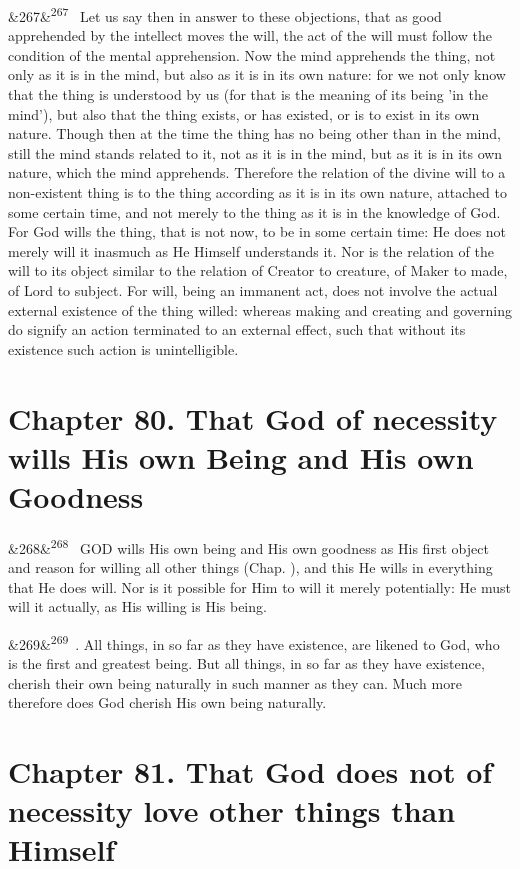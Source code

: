 \documentclass[12pt]{article}
\newcommand{\para}[1][]{\par\noindent\ifx&#1&\else\textsuperscript{\footnotesize #1}~\fi}
\begin{document}
\para[267] Let us say then in answer to these objections, that as good apprehended by the intellect moves the will, the act of the will must follow the condition of the mental apprehension. Now the mind apprehends the thing, not only as it is in the mind, but also as it is in its own nature: for we not only know that the thing is understood by us (for that is the meaning of its being 'in the mind'), but also that the thing exists, or has existed, or is to exist in its own nature. Though then at the time the thing has no being other than in the mind, still the mind stands related to it, not as it is in the mind, but as it is in its own nature, which the mind apprehends. Therefore the relation of the divine will to a non-existent thing is to the thing according as it is in its own nature, attached to some certain time, and not merely to the thing as it is in the knowledge of God. For God wills the thing, that is not now, to be in some certain time: He does not merely will it inasmuch as He Himself understands it. Nor is the relation of the will to its object similar to the relation of Creator to creature, of Maker to made, of Lord to subject. For will, being an immanent act, does not involve the actual external existence of the thing willed: whereas making and creating and governing do signify an action terminated to an external effect, such that without its existence such action is unintelligible.

\section*{Chapter 80. That God of necessity wills His own Being and His own Goodness}

\para[268] GOD wills His own being and His own goodness as His first object and reason for willing all other things (Chap. ), and this He wills in everything that He does will. Nor is it possible for Him to will it merely potentially: He must will it actually, as His willing is His being.

\para[269] 4. All things, in so far as they have existence, are likened to God, who is the first and greatest being. But all things, in so far as they have existence, cherish their own being naturally in such manner as they can. Much more therefore does God cherish His own being naturally.

\section*{Chapter 81. That God does not of necessity love other things than Himself}
\end{document}
